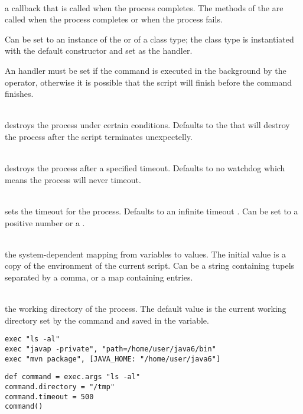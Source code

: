 \begin{asparaitem}
%
\item[\code{handler: ExecuteResultHandler}] \hfill \\
a callback that is called when the process completes. 
The methods of the \cite{executeresulthandler13} 
are called when the process completes or when the process fails.

Can be set to an instance of the  or of a class 
type; the class type is instantiated with the default
constructor and set as the handler.

An handler must be set if the command is executed in the background by the 
operator, otherwise it is possible that the script will finish before the command finishes.
%
\item[\code{destroyer: ProcessDestroyer}] \hfill \\
\cite{processdestroyer13}  destroys the process under certain conditions.
Defaults to the \cite{shutdownhookprocessdestroyer13}
that will destroy the process after the script terminates unexpectelly.
%
\item[\code{watchdog}] \hfill \\
destroys the process after a specified timeout. Defaults to 
no watchdog which means the process will never timeout.
%
\item[\code{timeout: (+)number|duration}] \hfill \\
sets the timeout for the process. Defaults to an infinite 
timeout  . Can be set to a positive
number or a \cite{duration13}.
%
\item[\code{env}] \hfill \\
the system-dependent mapping from variables
to values. The initial value is a copy of the environment of the current
script. Can be a string containing  tupels
separated by a comma, or a map containing  entries.
%
\item[\code{dir}] \hfill \\
the working directory of the process. The default value
is the current working directory set by the  command
and saved in the  variable.
%
\end{asparaitem}

\begin{lstlisting}[style=Groovybash, label={lst:example_exec1}, title={
Examples to execute external commands.}]
exec "ls -al"
exec "javap -private", "path=/home/user/java6/bin"
exec "mvn package", [JAVA_HOME: "/home/user/java6"]
\end{lstlisting}

\begin{lstlisting}[style=Groovybash, label={lst:example_exec2}, title={
Deleyed execution of external commands.}]
def command = exec.args "ls -al"
command.directory = "/tmp"
command.timeout = 500
command()
\end{lstlisting}

